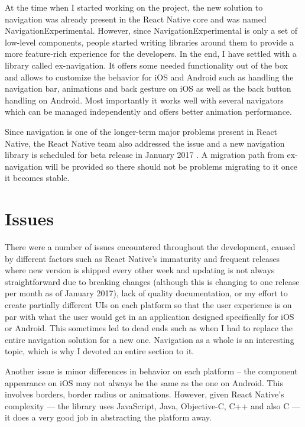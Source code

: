 At the time when I started working on the project, the new solution to navigation was already present in the React Native core and was named NavigationExperimental. However, since NavigationExperimental is only a set of low-level components, people started writing libraries around them to provide a more feature-rich experience for the developers. In the end, I have settled with a library called ex-navigation. It offers some needed functionality out of the box and allows to customize the behavior for iOS and Android such as handling the navigation bar, animations and back gesture on iOS as well as the back button handling on Android. Most importantly it works well with several navigators which can be managed independently and offers better animation performance. 

Since navigation is one of the longer-term major problems present in React Native, the React Native team also addressed the issue and a new navigation library is scheduled for beta release in January 2017 \cite{exnav}. A migration path from ex-navigation will be provided so there should not be problems migrating to it once it becomes stable.

\section{Issues}

There were a number of issues encountered throughout the development, caused by different factors such as React Native's immaturity and frequent releases where new version is shipped every other week and updating is not always straightforward due to breaking changes (although this is changing to one release per month as of January 2017), lack of quality documentation, or my effort to create partially different UIs on each platform so that the user experience is on par with what the user would get in an application designed specifically for iOS or Android. This sometimes led to dead ends such as when I had to replace the entire navigation solution for a new one. Navigation as a whole is an interesting topic, which is why I devoted an entire section to it.


Another issue is minor differences in behavior on each platform -- the component appearance on iOS may not always be the same as the one on Android. This involves borders, border radius or animations. However, given React Native's complexity --- the library uses JavaScript, Java, Objective-C, C++ and also C --- it does a very good job in abstracting the platform away.


